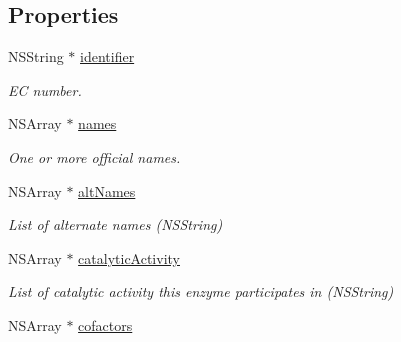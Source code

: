 \subsection*{Properties}
\begin{DoxyCompactItemize}
\item 
\hypertarget{interface_e_k_enzyme_a2eb0c3b68e5b85b03db51f499eb55c73}{
NSString $\ast$ \hyperlink{interface_e_k_enzyme_a2eb0c3b68e5b85b03db51f499eb55c73}{identifier}}
\label{interface_e_k_enzyme_a2eb0c3b68e5b85b03db51f499eb55c73}

\begin{DoxyCompactList}\small\item\em EC number. \end{DoxyCompactList}\item 
\hypertarget{interface_e_k_enzyme_a51923e0151b7f71b0d0ffd923211057e}{
NSArray $\ast$ \hyperlink{interface_e_k_enzyme_a51923e0151b7f71b0d0ffd923211057e}{names}}
\label{interface_e_k_enzyme_a51923e0151b7f71b0d0ffd923211057e}

\begin{DoxyCompactList}\small\item\em One or more official names. \end{DoxyCompactList}\item 
\hypertarget{interface_e_k_enzyme_a775227063dfd8b432732400dc26ca51f}{
NSArray $\ast$ \hyperlink{interface_e_k_enzyme_a775227063dfd8b432732400dc26ca51f}{altNames}}
\label{interface_e_k_enzyme_a775227063dfd8b432732400dc26ca51f}

\begin{DoxyCompactList}\small\item\em List of alternate names (NSString) \end{DoxyCompactList}\item 
\hypertarget{interface_e_k_enzyme_aa4d27319b81bd7e036a802cd434c4882}{
NSArray $\ast$ \hyperlink{interface_e_k_enzyme_aa4d27319b81bd7e036a802cd434c4882}{catalyticActivity}}
\label{interface_e_k_enzyme_aa4d27319b81bd7e036a802cd434c4882}

\begin{DoxyCompactList}\small\item\em List of catalytic activity this enzyme participates in (NSString) \end{DoxyCompactList}\item 
\hypertarget{interface_e_k_enzyme_a180655bc4fc49c3c6b5b9b7c8ccb706f}{
NSArray $\ast$ \hyperlink{interface_e_k_enzyme_a180655bc4fc49c3c6b5b9b7c8ccb706f}{cofactors}}
\label{interface_e_k_enzyme_a180655bc4fc49c3c6b5b9b7c8ccb706f}


\end{DoxyCompactItemize}
